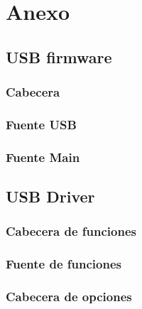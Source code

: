 \chapter{Anexo}%




\section{USB firmware}
\subsection{Cabecera}


\subsection{Fuente USB}


\subsection{Fuente Main}


\section{USB Driver}
\subsection{Cabecera de funciones}


\subsection{Fuente de funciones}


\subsection{Cabecera de opciones}


